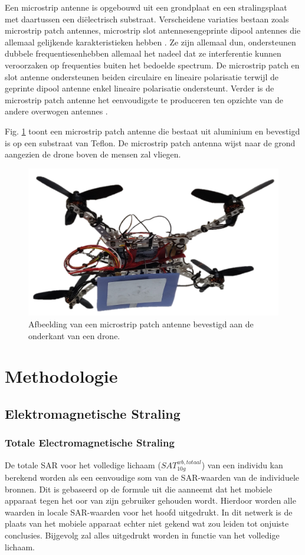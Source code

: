 \documentclass[twocolumn]{phdsymp_dutch}
\begin{document}
Een microstrip antenne is opgebouwd uit een grondplaat en een stralingsplaat met daartussen een di\"electrisch substraat.
Verscheidene variaties bestaan zoals microstrip patch antennes, microstrip slot antennesengeprinte dipool antennes 
die allemaal gelijkende karakteristieken hebben \cite{J13_microstripadvantages,J14_antennadesign}. 
Ze zijn allemaal dun, ondersteunen dubbele frequentiesenhebben allemaal het nadeel dat 
ze interferentie kunnen veroorzaken op frequenties buiten het bedoelde spectrum. 
De microstrip patch en slot antenne ondersteunen beiden circulaire en lineaire polarisatie terwijl de geprinte dipool antenne enkel 
lineaire polarisatie ondersteunt. Verder is de microstrip patch antenne het eenvoudigste te produceren ten opzichte 
van de andere overwogen antennes \cite{J13_microstripadvantages}. 

Fig. \ref{fig:exampleDrone} toont een microstrip patch antenne die bestaat 
uit aluminium en bevestigd is op een substraat van Teflon. De microstrip patch antenna 
wijst naar de grond aangezien de drone boven de mensen zal vliegen.

\begin{figure}[h]
\centering
  \includegraphics[width=0.5\linewidth]{drone.png}
  \caption{Afbeelding van een microstrip patch antenne bevestigd aan de onderkant van een drone. }
  \label{fig:exampleDrone}
\end{figure}

\section{Methodologie}
\subsection{Elektromagnetische Straling}
\subsubsection{Totale Electromagnetische Straling}
De totale \gls{SAR} voor het volledige lichaam ($SAT^{wb,totaal}_{10g}$) van een individu 
kan berekend worden als een eenvoudige som van de \gls{SAR}-waarden van de individuele bronnen. 
Dit is gebaseerd op de formule uit \cite{J17_kuehn2019modelling} die aanneemt dat het mobiele apparaat 
tegen het oor van zijn gebruiker gehouden wordt. Hierdoor worden alle waarden in locale \gls{SAR}-waarden voor het hoofd uitgedrukt.
In dit netwerk is de plaats van het mobiele apparaat echter  niet  gekend wat zou leiden tot onjuiste conclusies. Bijgevolg 
zal alles uitgedrukt worden in functie van het volledige lichaam.
\end{document}
